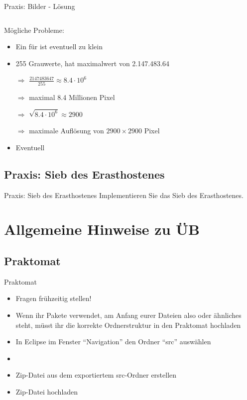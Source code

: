 \documentclass[usepdftitle=false,hyperref={pdfpagelabels=false}]{beamer}
\begin{document}
\begin{frame}{Praxis: Bilder - Lösung}
    \inputminted[linenos=true, numbersep=5pt, tabsize=4, fontsize=\tiny]{java}{Bilder.java}

    Mögliche Probleme:
    \begin{itemize}
        \item Ein  für  ist eventuell zu klein
        \item 255 Grauwerte,  hat maximalwert von 2.147.483.64
        \item[$\Rightarrow$] $\frac{2147483647}{255} \approx 8.4 \cdot 10^6$
        \item[$\Rightarrow$] maximal 8.4 Millionen Pixel
        \item[$\Rightarrow$] $\sqrt{8.4 \cdot 10^6} \approx 2900$
        \item[$\Rightarrow$] maximale Auflösung von $2900 \times 2900$ Pixel
        \item Eventuell 
    \end{itemize}
\end{frame}

\subsection{Praxis: Sieb des Erasthostenes}
\begin{frame}{Praxis: Sieb des Erasthostenes}
    Implementieren Sie das Sieb des Erasthostenes.
\end{frame}

\section{Allgemeine Hinweise zu ÜB}
\subsection{Praktomat}
\begin{frame}{Praktomat}
    \begin{itemize}
        \item Fragen frühzeitig stellen!
        \item Wenn ihr Pakete verwendet, am Anfang eurer Dateien
              also  oder ähnliches steht,
              müsst ihr die korrekte Ordnerstruktur in den Praktomat
              hochladen
        \item In Eclipse im Fenster "`Navigation"' den Ordner "`src"'
              auswählen
        \item {}
        \item Zip-Datei aus dem exportiertem src-Ordner erstellen
        \item Zip-Datei hochladen
    \end{itemize}
\end{frame}
\end{document}
